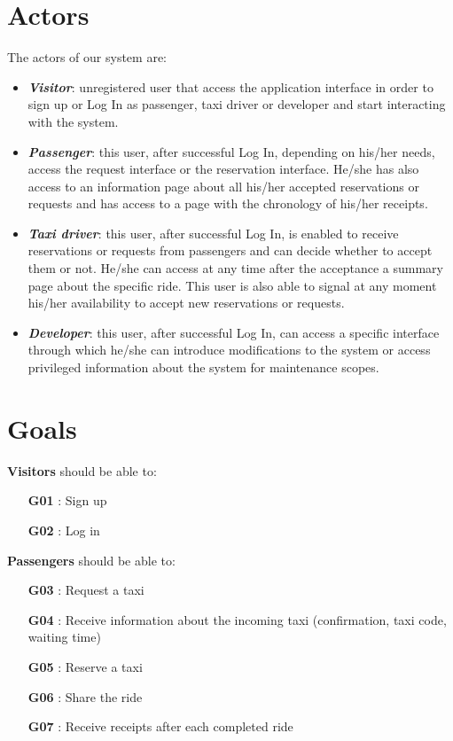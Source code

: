 \section{Actors}
The actors of our system are:
\begin{itemize}
	\item \textbf{\textit{Visitor}}: unregistered user that access the application interface in order to sign up or Log In as passenger, taxi driver or developer and start interacting with the system.
	\item \textbf{\textit{Passenger}}: this user, after successful Log In, depending on his/her needs, access the request interface or the reservation interface. He/she has also access to an information page about all his/her accepted reservations or requests and has access to a page with the chronology of his/her receipts.
	\item \textbf{\textit{Taxi driver}}: this user, after successful Log In, is enabled to receive reservations or requests from passengers and can decide whether to accept them or not. He/she can access at any time after the acceptance a summary page about the specific ride. This user is also able to signal at any moment his/her availability to accept new reservations or requests.
	\item \textbf{\textit{Developer}}: this user, after successful Log In, can access a specific interface through which he/she can introduce modifications to the system or access privileged information about the system for maintenance scopes.
\end{itemize}

\section{Goals}
\noindent \textbf{Visitors} should be able to:
\begin{itemize}
	\item [\textbf{G01}] : Sign up
	\item [\textbf{G02}] : Log in
\end{itemize}

\noindent \textbf{Passengers} should be able to:
\begin{itemize}
	\item [\textbf{G03}] : Request a taxi
	\item [\textbf{G04}] : Receive information about the incoming taxi (confirmation, taxi code, waiting time)
	\item [\textbf{G05}] : Reserve a taxi
	\item [\textbf{G06}] : Share the ride
	\item [\textbf{G07}] : Receive receipts after each completed ride
\end{itemize}

